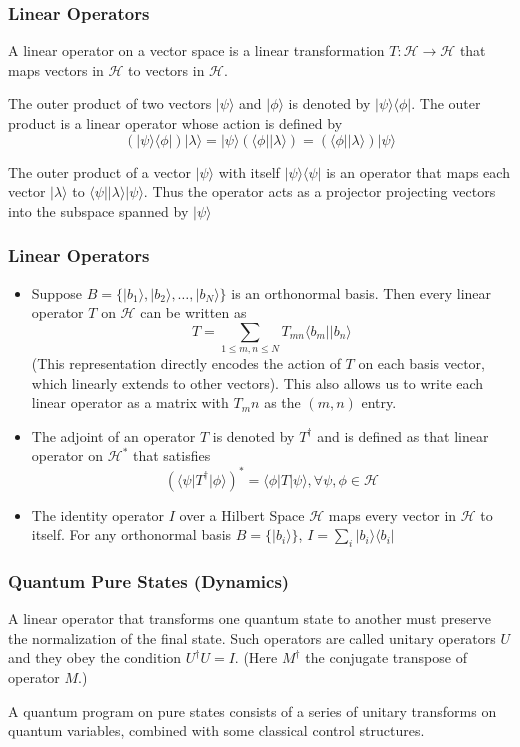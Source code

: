 \documentclass{beamer}
\newcommand{\bra}[1]{\langle #1 \vert}
\newcommand{\ket}[1]{\vert #1 \rangle}
\begin{document}
\begin{frame}
  \frametitle{Linear Operators}
  A linear operator on a vector space is a linear transformation $T : \mathcal{H} \rightarrow \mathcal{H}$ that maps vectors in $\mathcal{H}$ to vectors in $\mathcal{H}$.

  The outer product of two vectors $\ket{\psi}$ and $\ket{\phi}$ is denoted by $\ket{\psi}\bra{\phi}$. The outer product is a linear operator whose action is defined by
  $$
  (\ket{\psi}\bra{\phi})\ket{\lambda}=\ket{\psi}(\bra{\phi}\ket{\lambda}) = (\bra{\phi}\ket{\lambda})\ket{\psi}
  $$

  The outer product of a vector $\ket{\psi}$ with itself $\ket{\psi}\bra{\psi}$ is an operator that maps each vector $\ket{\lambda}$ to $\bra{\psi}\ket{\lambda}\ket{\psi}$. Thus the operator acts as a projector projecting vectors into the subspace spanned by $\ket{\psi}$
\end{frame}

\begin{frame}
  \frametitle{Linear Operators}
\begin{itemize}    \item Suppose $B = \{\ket{b_1},\ket{b_2},\dots,\ket{b_N}\}$ is an orthonormal basis. Then every linear operator $T$ on $\mathcal{H}$ can be written as
  $$
  T = \sum\limits_{1\le m,n \le N} T_{mn}\bra{b_m}\ket{b_n}
  $$
  (This representation directly encodes the action of $T$ on each basis vector, which linearly extends to other vectors). This also allows us to write each linear operator as a matrix with $T_mn$ as the $(m,n)$ entry.

  \item The adjoint of an operator $T$ is denoted by $T^\dagger$ and is defined as that linear operator on $\mathcal{H}^*$ that satisfies
  $$
  (\bra{\psi}T^\dagger \ket{\phi})^*=\bra{\phi}T\ket{\psi}, \forall \psi,\phi \in \mathcal{H}
  $$

\item The identity operator $I$ over a Hilbert Space $\mathcal{H}$ maps every vector in $\mathcal{H}$ to itself. For any orthonormal basis $B=\{\ket{b_i}\}$, $I=\sum\limits_i\ket{b_i}\bra{b_i}$
  \end{itemize}
\end{frame}

\begin{frame}
  \frametitle{Quantum Pure States (Dynamics)}
  A linear operator that transforms one quantum state to another must preserve the normalization of the final state. Such operators are called unitary operators $U$ and they obey the condition $U^{\dagger}U = I$. (Here $M^{\dagger}$ the conjugate transpose of operator $M$.)

  A quantum program on pure states consists of a series of unitary transforms on quantum variables, combined with some classical control structures.
\end{frame}
\end{document}
